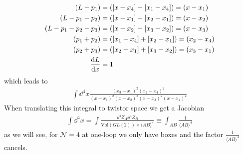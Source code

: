 \documentclass[letter,12pt]{article}
\newcommand{\la}{\langle}
\newcommand{\ra}{\rangle}
\begin{document}
\begin{equation}
	\begin{aligned}
		(L-p_1)&=([x-x_4]-[x_1-x_4])=(x-x_1)\\
		(L-p_1-p_2)&=([x-x_1]-[x_2-x_1])=(x-x_2)\\
		(L-p_1-p_2-p_3)&=([x-x_2]-[x_3-x_2])=(x-x_3)\\
		(p_1+p_2)&=([x_1-x_4]+[x_2-x_1])=(x_2-x_4)
		\\
		(p_2+p_3)&=([x_2-x_1]+[x_3-x_2])=(x_3-x_1)\\
		\dv{L}{x}&=1
		\end{aligned}
\end{equation}
which leads to
\begin{equation}
	\begin{aligned}
\int \dd^4 x	\frac{	(x_3-x_1)^2(x_2-x_4)^2}{(x-x_1)^2(x-x_2)^2(x-x_3)^2(x-x_4)^2}
	\end{aligned}
\end{equation}
When translating this integral to twistor space we get a Jacobian
\begin{equation}
	\begin{aligned}
	\int	\dd^4 x = \int \frac{\dd^4 Z_A \dd^4 Z_B}{\text{Vol}(GL(2))\times \la A B \ra^4} \equiv \int_{AB}\frac{1}{\la A B \ra^4}
	\end{aligned}
\end{equation}
as we will see, for $\mathcal{N}=4$ at one-loop we only have boxes and the factor $\frac{1}{\la A B \ra^4}$ cancels. 
\end{document}
